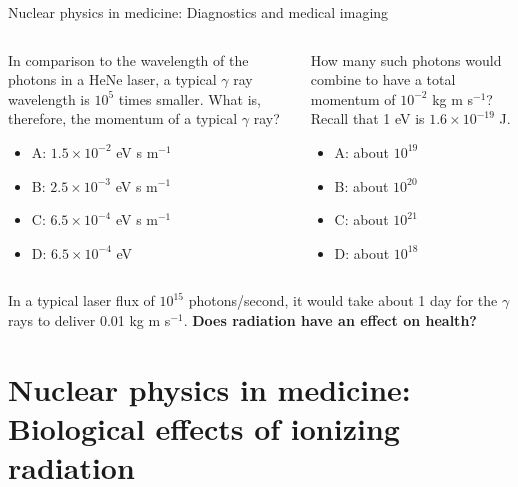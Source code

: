 \documentclass{beamer}
\begin{document}
\begin{frame}{Nuclear physics in medicine: Diagnostics and medical imaging}
\small
\begin{columns}[T]
\begin{column}{0.5\textwidth}
In comparison to the wavelength of the photons in a HeNe laser, a typical $\gamma$ ray wavelength is $10^5$ times smaller.  What is, therefore, the momentum of a typical $\gamma$ ray?
\begin{itemize}
\item A: $1.5 \times 10^{-2}$ eV s m$^{-1}$
\item B: $2.5 \times 10^{-3}$ eV s m$^{-1}$
\item C: $6.5 \times 10^{-4}$ eV s m$^{-1}$
\item D: $6.5 \times 10^{-4}$ eV
\end{itemize}
\end{column}
\begin{column}{0.5\textwidth}
How many such photons would combine to have a total momentum of $10^{-2}$ kg m s$^{-1}$?  Recall that 1 eV is $1.6 \times 10^{-19}$ J.
\begin{itemize}
\item A: about $10^{19}$
\item B: about $10^{20}$
\item C: about $10^{21}$
\item D: about $10^{18}$
\end{itemize}
\end{column}
\end{columns}
\vspace{0.5cm}
\footnotesize
In a typical laser flux of $10^{15}$ photons/second, it would take about 1 day for the $\gamma$ rays to deliver 0.01 kg m s$^{-1}$.  \textbf{Does radiation have an effect on health?}
\end{frame}

\section{Nuclear physics in medicine: Biological effects of ionizing radiation}
\end{document}
